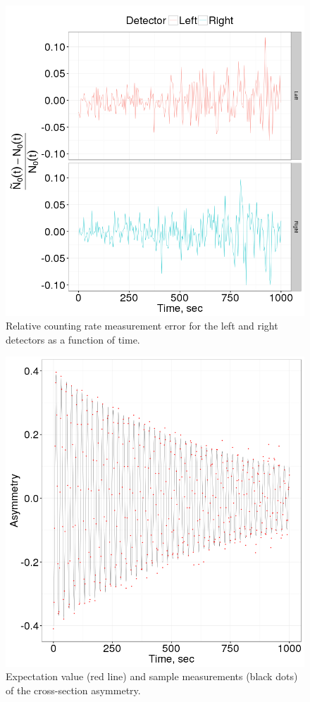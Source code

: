 \begin{figure}[h]
  \centering
  \includegraphics[scale=.85]{images/App_Stats/LR_detector_relErr}
  \caption{Relative counting rate measurement error for the left and right detectors as a function of time.\label{fig:LRDetErr}}
\end{figure}

\begin{figure}[h]
  \centering
  \includegraphics[scale=.85]{images/App_Stats/Asymmetry}
  \caption{Expectation value (red line) and sample measurements (black dots) of the cross-section asymmetry.\label{fig:Asym}}
\end{figure}


